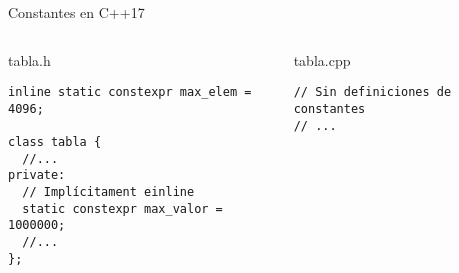 \begin{frame}[t,fragile]{Constantes en C++17}
\begin{columns}[T]


\begin{block}{tabla.h}
\begin{lstlisting}
inline static constexpr max_elem = 4096;

class tabla {
  //...
private:
  // Implícitament einline
  static constexpr max_valor = 1000000;
  //...
};
\end{lstlisting}
\end{block}

\begin{block}{tabla.cpp}
\begin{lstlisting}
// Sin definiciones de constantes
// ...
\end{lstlisting}
\end{block}
 
\end{columns}
\end{frame}



